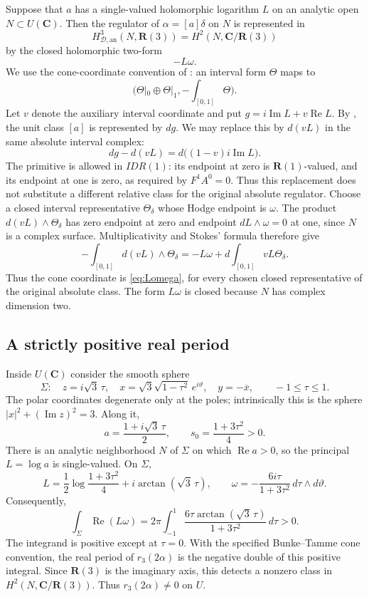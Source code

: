 \documentclass[11pt,a4paper]{article}
\theoremstyle{remark}
\newcommand{\R}{\mathbf R}
\newcommand{\C}{\mathbf C}
\newcommand{\HD}{H_{\mathcal D,\mathrm{an}}}
\begin{document}
Suppose that $a$ has a single-valued holomorphic logarithm $L$ on an analytic open $N\subset U(\C)$. Then the regulator of $\alpha=[a]\delta$ on $N$ is represented in
\[
\HD^3(N,\R(3))=H^2(N,\C/\R(3))
\]
by the closed holomorphic two-form
\begin{equation}\label{eq:Lomega}
-L\omega.
\end{equation}
We use the cone-coordinate convention of \cite[Proposition~2.8]{BunkeTamme}: an interval form $\Theta$ maps to
\[
\bigl(\Theta|_0\oplus\Theta|_1,-\textstyle\int_{[0,1]}\Theta\bigr).
\]
Let $v$ denote the auxiliary interval coordinate and put $g=i\operatorname{Im}L+v\operatorname{Re}L$.
By \cite[Lemma~4.5]{BunkeTamme}, the unit class $[a]$ is represented by $dg$.
We may replace this by $d(vL)$ in the same absolute interval complex:
\[
dg-d(vL)=d\bigl((1-v)i\operatorname{Im}L\bigr).
\]
The primitive is allowed in $IDR(1)$: its endpoint at zero is
$\R(1)$-valued, and its endpoint at one is zero, as required by
$F^1A^0=0$. Thus this replacement does not substitute a different
relative class for the original absolute regulator.
Choose a closed interval representative $\Theta_\delta$ whose Hodge endpoint is $\omega$.
The product $d(vL)\wedge\Theta_\delta$ has zero endpoint at zero and
endpoint $dL\wedge\omega=0$ at one, since $N$ is a complex surface.
Multiplicativity and Stokes' formula therefore give
\[
-\int_{[0,1]}d(vL)\wedge\Theta_\delta
=-L\omega+d\int_{[0,1]}vL\Theta_\delta.
\]
Thus the cone coordinate is \eqref{eq:Lomega}, for every chosen
closed representative of the original absolute class. The form
$L\omega$ is closed because $N$ has complex dimension two.

\subsection{A strictly positive real period}
Inside $U(\C)$ consider the smooth sphere
\[
\Sigma:\quad z=i\sqrt3\,\tau,\quad
x=\sqrt3\sqrt{1-\tau^2}\,e^{i\vartheta},\quad
y=-\overline x,\qquad -1\leq\tau\leq1.
\]
The polar coordinates degenerate only at the poles; intrinsically this is the sphere $|x|^2+(\operatorname{Im}z)^2=3$. Along it,
\[
a=\frac{1+i\sqrt3\,\tau}{2},\qquad
s_0=\frac{1+3\tau^2}{4}>0.
\]
There is an analytic neighborhood $N$ of $\Sigma$ on which $\operatorname{Re}a>0$, so the principal $L=\log a$ is single-valued. On $\Sigma$,
\[
L=\frac12\log\frac{1+3\tau^2}{4}+i\arctan(\sqrt3\,\tau),
\qquad
\omega=-\frac{6i\tau}{1+3\tau^2}\,d\tau\wedge d\vartheta.
\]
Consequently,
\begin{equation}\label{eq:positiveperiod}
\int_{\Sigma}\operatorname{Re}(L\omega)
=2\pi\int_{-1}^{1}
\frac{6\tau\arctan(\sqrt3\,\tau)}{1+3\tau^2}\,d\tau>0.
\end{equation}
The integrand is positive except at $\tau=0$. With the specified Bunke--Tamme cone convention, the real period of $r_3(2\alpha)$ is the negative double of this positive integral. Since $\R(3)$ is the imaginary axis, this detects a nonzero class in $H^2(N,\C/\R(3))$. Thus $r_3(2\alpha)\neq0$ on $U$.
\end{document}
